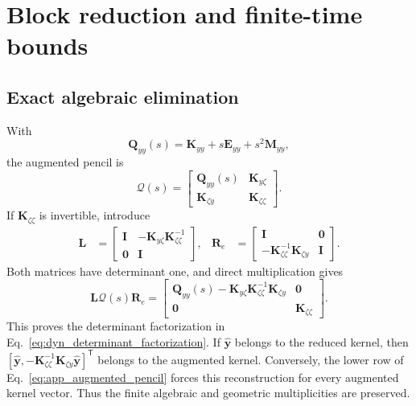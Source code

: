 \section{Block reduction and finite-time bounds}
\label{app:operator_blocks}

\subsection{Exact algebraic elimination}

With
\begin{equation}
 \boldsymbol Q_{yy}(s)
 =\boldsymbol K_{yy}+s\boldsymbol E_{yy}+s^2\boldsymbol M_{yy},
 \label{eq:app_Qyy}
\end{equation}
the augmented pencil is
\begin{equation}
 \boldsymbol{\mathcal Q}(s)=
 \begin{bmatrix}
  \boldsymbol Q_{yy}(s)&\boldsymbol K_{y\zeta}\\
  \boldsymbol K_{\zeta y}&\boldsymbol K_{\zeta\zeta}
 \end{bmatrix}.
 \label{eq:app_augmented_pencil}
\end{equation}
If $\boldsymbol K_{\zeta\zeta}$ is invertible, introduce
\begin{align}
 \boldsymbol L&=
 \begin{bmatrix}
  \boldsymbol I&-\boldsymbol K_{y\zeta}
  \boldsymbol K_{\zeta\zeta}^{-1}\\
  \boldsymbol0&\boldsymbol I
 \end{bmatrix},
 &
 \boldsymbol R_e&=
 \begin{bmatrix}
  \boldsymbol I&\boldsymbol0\\
  -\boldsymbol K_{\zeta\zeta}^{-1}
  \boldsymbol K_{\zeta y}&\boldsymbol I
 \end{bmatrix}.
 \label{eq:app_elimination_matrices}
\end{align}
Both matrices have determinant one, and direct multiplication gives
\begin{equation}
 \boldsymbol L\boldsymbol{\mathcal Q}(s)\boldsymbol R_e
 =\begin{bmatrix}
  \boldsymbol Q_{yy}(s)-\boldsymbol K_{y\zeta}
  \boldsymbol K_{\zeta\zeta}^{-1}\boldsymbol K_{\zeta y}
  &\boldsymbol0\\
  \boldsymbol0&\boldsymbol K_{\zeta\zeta}
 \end{bmatrix}.
 \label{eq:app_block_diagonalization}
\end{equation}
This proves the determinant factorization in Eq.~\eqref{eq:dyn_determinant_factorization}. If $\widehat{\boldsymbol y}$ belongs to the reduced kernel, then
$[\widehat{\boldsymbol y},-\boldsymbol K_{\zeta\zeta}^{-1}
\boldsymbol K_{\zeta y}\widehat{\boldsymbol y}]^{\mathsf T}$
belongs to the augmented kernel. Conversely, the lower row of Eq.~\eqref{eq:app_augmented_pencil} forces this reconstruction for every augmented kernel vector. Thus the finite algebraic and geometric multiplicities are preserved.

